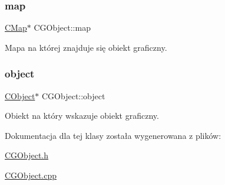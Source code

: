 \subsubsection{\texorpdfstring{map}{map}}
{\footnotesize\ttfamily \mbox{\hyperlink{class_c_map}{C\+Map}}$\ast$ C\+G\+Object\+::map\hspace{0.3cm}{\ttfamily [protected]}}



Mapa na której znajduje się obiekt graficzny. 

\mbox{\label{class_c_g_object_a8955574357e33ce28957c4ff42154cfb}} 
\subsubsection{\texorpdfstring{object}{object}}
{\footnotesize\ttfamily \mbox{\hyperlink{class_c_object}{C\+Object}}$\ast$ C\+G\+Object\+::object\hspace{0.3cm}{\ttfamily [protected]}}



Obiekt na który wskazuje obiekt graficzny. 



Dokumentacja dla tej klasy została wygenerowana z plików\+:\begin{DoxyCompactItemize}
\item 
\mbox{\hyperlink{_c_g_object_8h}{C\+G\+Object.\+h}}\item 
\mbox{\hyperlink{_c_g_object_8cpp}{C\+G\+Object.\+cpp}}\end{DoxyCompactItemize}
